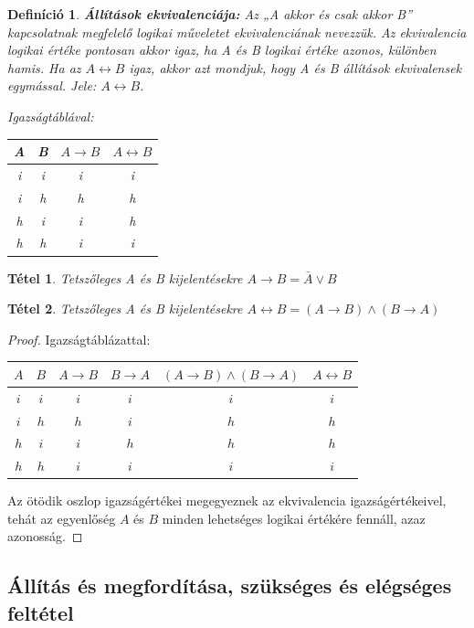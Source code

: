 \documentclass[12pt,a4paper]{article}
\newtheorem{theorem}{Tétel} [section]
\newtheorem{definition}{Definíció} [section]
\begin{document}
\begin{definition}
\textbf{Állítások ekvivalenciája:} Az „A akkor és csak akkor B” kapcsolatnak megfelelő logikai műveletet ekvivalenciának nevezzük. Az ekvivalencia logikai értéke pontosan akkor igaz, ha A és B logikai értéke azonos, különben hamis. Ha az $A \leftrightarrow B$ igaz, akkor azt mondjuk, hogy A és B állítások ekvivalensek egymással.
Jele: $A \leftrightarrow B$.

Igazságtáblával:

\begin{center}
\begin{tabular}{c|c|c|c}
A & B & $A \rightarrow B$ & $A \leftrightarrow B$ \\ \hline
i & i & i & i  \\
i & h & h & h \\
h & i & i & h\\
h & h & i & i\\
\end{tabular}
\end{center}
\end{definition}

\begin{theorem}
Tetszőleges A és B kijelentésekre $A \rightarrow B = \bar{A} \lor B$
\end{theorem}

\begin{theorem}
Tetszőleges A és B kijelentésekre $A \leftrightarrow B = (A \rightarrow B) \land (B \rightarrow A)$
\end{theorem}
\begin{proof}
Igazságtáblázattal:
\begin{center}
\begin{tabular}{c|c|c|c|c|c}
$A$ & $B$ & $A \rightarrow B$ & $B \rightarrow A$ & $(A \rightarrow B) \land (B \rightarrow A)$ & $A \leftrightarrow B$ \\ \hline
$i$&$i$&$i$&$i$&$i$&$i$ \\
$i$&$h$&$h$&$i$&$h$&$h$ \\
$h$&$i$&$i$&$h$&$h$&$h$ \\
$h$&$h$&$i$&$i$&$i$&$i$ \\
\end{tabular}
\end{center}
Az ötödik oszlop igazságértékei megegyeznek az ekvivalencia igazságértékeivel, tehát az egyenlőség $A$ és $B$ minden lehetséges logikai értékére fennáll, azaz azonosság.
\end{proof}
\newpage
\subsection{Állítás és megfordítása, szükséges és elégséges feltétel}
\end{document}
